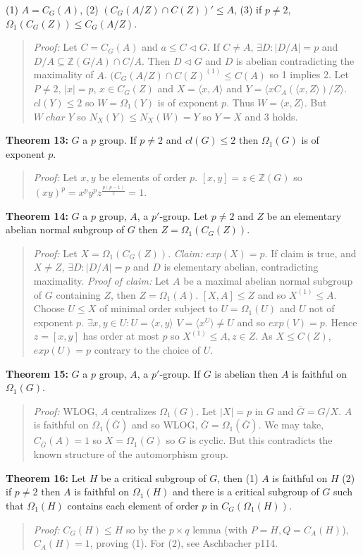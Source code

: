 (1) $A=C_G(A)$,
(2) $(C_G(A/Z) \cap C(Z))' \le A$,
(3) if $p \ne 2$, $\Omega_1(C_G(Z)) \le C_G(A/Z)$.
\begin{quote}
\emph{Proof:}  
Let $C= C_G(A)$ and $a \le C \lhd G$.  If $C \ne A$, $\exists D: |D/A|= p$ and
$D/A \subseteq {\mathbb Z}(G/A) \cap C/A$.  Then $D \lhd G$ and $D$ is abelian
contradicting the maximality of $A$.  $(C_G(A/Z) \cap C(Z)^{(1)} \le C(A)$ so
1 implies 2.  Let $P \ne 2$, $|x|= p$, $x \in C_G(Z)$ and $X= \langle x, A \rangle$
and $Y= \langle x C_A(\langle x, Z \rangle)/Z \rangle$.  $cl(Y) \le 2$ so
$W=\Omega_1(Y)$ is of exponent $p$.  Thus $W= \langle x, Z \rangle$.  But
$W \; char \; Y$ so $N_X(Y) \le N_X(W)=Y$ so $Y= X$ and 3 holds.
\end{quote}
{\bf Theorem 13:}
$G$ a $p$ group.
If $p \ne 2$ and $cl(G) \le 2$ then $\Omega_1(G)$ is of exponent $p$.
\begin{quote}
\emph{Proof:}  
Let $x, y$ be elements of order $p$.  $[x, y]= z \in {\mathbb Z}(G)$ so
$(xy)^p = x^p y^p z^{\frac {p(p-1)} 2}= 1$.
\end{quote}
{\bf Theorem 14:}
$G$ a $p$ group, $A$, a $p'$-group.
Let $p \ne 2$ and $Z$ be an elementary abelian normal subgroup of $G$ then $Z= \Omega_1(C_G(Z))$.
\begin{quote}
\emph{Proof:}  
Let $X= \Omega_1(C_G(Z))$.  \emph{Claim:} $exp(X)=p$.  If claim is true,
and $X \ne Z$, $\exists D: |D/A|=p$ and $D$ is elementary abelian, contradicting
maximality.  \emph{Proof of claim:}
Let $A$ be a maximal  abelian normal subgroup of $G$ containing $Z$, then $Z= \Omega_1(A)$.
$[X, A] \le Z$ and so $X^{(1)} \le A$.   Choose $U \le X$ of minimal order subject to
$U= \Omega_1(U)$ and $U$ not of exponent $p$.  $\exists x, y \in U: U= \langle x, y \rangle$
$V= \langle x^U \rangle \ne U$ and so $exp(V)=p$.  Hence $z=[x,y]$ has order at most $p$ so
$X^{(1)} \le A, z \in Z$.  As $X \le C(Z)$, $exp(U)=p$ contrary to the choice of $U$.
\end{quote}
{\bf Theorem 15:}
$G$ a $p$ group, $A$, a $p'$-group.
If $G$ is abelian then $A$ is faithful on $\Omega_1(G)$.
\begin{quote}
\emph{Proof:}  
WLOG, $A$ centralizes $\Omega_1(G)$.  Let $|X|= p$ in $G$ and ${\overline G}= G/X$.
$A$ is faithful on $\Omega_1({\overline G})$ and so WLOG, ${\overline G}= \Omega_1({\overline G})$.
We may take, $C_{\overline G}(A)=1$ so $X= \Omega_1(G)$ so $G$ is cyclic.  But this contradicts
the known structure of the automorphism group.
\end{quote}
{\bf Theorem 16:}
Let $H$ be a critical subgroup of $G$, then (1) $A$ is faithful on $H$
(2) if $p \ne 2$ then $A$ is faithful on $\Omega_1(H)$ and there is a critical subgroup
of $G$ such that $\Omega_1(H)$ contains each element of order $p$ in
$C_G(\Omega_1(H))$.
\begin{quote}
\emph{Proof:}  
$C_G(H) \leq H$ so by the $p \times q$ lemma (with $P=H, Q = C_A(H)$), $C_A(H)=1$,
proving (1).  For (2), see Aschbacher p114.
\end{quote}
